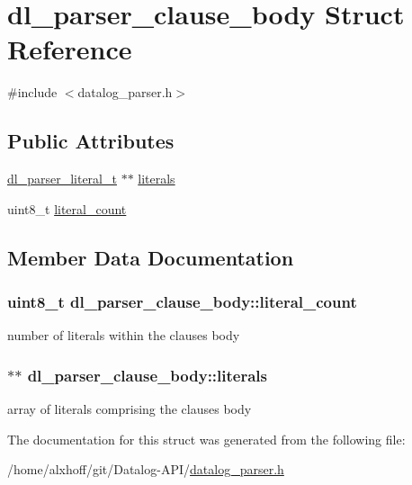 \hypertarget{structdl__parser__clause__body}{}\section{dl\+\_\+parser\+\_\+clause\+\_\+body Struct Reference}
\label{structdl__parser__clause__body}


{\ttfamily \#include $<$datalog\+\_\+parser.\+h$>$}

\subsection*{Public Attributes}
\begin{DoxyCompactItemize}
\item 
\hyperlink{datalog__parser_8h_adaef2eede58b9f7698925f7194af1373}{dl\+\_\+parser\+\_\+literal\+\_\+t} $\ast$$\ast$ \hyperlink{structdl__parser__clause__body_ac0e5f02f4945d0b0f4b295dad8a9f0a4}{literals}
\item 
uint8\+\_\+t \hyperlink{structdl__parser__clause__body_a5e0dedd1c1f24ab3bf32794241ed3001}{literal\+\_\+count}
\end{DoxyCompactItemize}


\subsection{Member Data Documentation}
\subsubsection[{\texorpdfstring{literal\+\_\+count}{literal_count}}]{\setlength{\rightskip}{0pt plus 5cm}uint8\+\_\+t dl\+\_\+parser\+\_\+clause\+\_\+body\+::literal\+\_\+count}\hypertarget{structdl__parser__clause__body_a5e0dedd1c1f24ab3bf32794241ed3001}{}\label{structdl__parser__clause__body_a5e0dedd1c1f24ab3bf32794241ed3001}
number of literals within the clause\textquotesingle{}s body 
\subsubsection[{\texorpdfstring{literals}{literals}}]{$\ast$$\ast$ dl\+\_\+parser\+\_\+clause\+\_\+body\+::literals}\hypertarget{structdl__parser__clause__body_ac0e5f02f4945d0b0f4b295dad8a9f0a4}{}\label{structdl__parser__clause__body_ac0e5f02f4945d0b0f4b295dad8a9f0a4}
array of literals comprising the clause\textquotesingle{}s body 

The documentation for this struct was generated from the following file\+:\begin{DoxyCompactItemize}
\item 
/home/alxhoff/git/\+Datalog-\/\+A\+P\+I/\hyperlink{datalog__parser_8h}{datalog\+\_\+parser.\+h}\end{DoxyCompactItemize}
